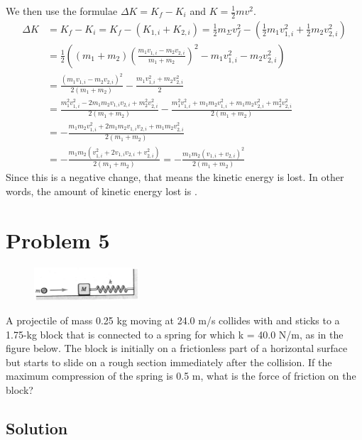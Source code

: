 \documentclass[12pt]{article}
\begin{document}
We then use the formulae \( \Delta K = K_f - K_i \) and \( K = \frac{1}{2}mv^2 \).
\begin{align*}
    \Delta K &= K_f - K_i
        =   K_f - (K_{1,i} + K_{2,i})
        =   \frac{1}{2}m_\Sigma v_f^2 - \left(\frac{1}{2}m_1v_{1,i}^2 + \frac{1}{2}m_2v_{2,i}^2\right)\\
        &=  \frac{1}{2}\left( (m_1 + m_2) \left(\frac{m_1 v_{1,i} - m_2 v_{2,i}}{m_1 + m_2}\right)^2 - m_1v_{1,i}^2 - m_2v_{2,i}^2 \right)\\
        &=  \frac{(m_1 v_{1,i} - m_2 v_{2,i})^2}{2(m_1 + m_2)} - \frac{m_1v_{1,i}^2 + m_2v_{2,i}^2}{2}\\
        &=  \frac{m_1^2 v_{1,i}^2 - 2m_1m_2v_{1,i}v_{2,i} + m_2^2 v_{2,i}^2}{2(m_1 + m_2)} - \frac{m_1^2v_{1,i}^2 + m_1m_2v_{1,i}^2 + m_1m_2v_{2,i}^2 + m_2^2v_{2,i}^2}{2(m_1 + m_2)}\\
        &=  -\frac{m_1m_2v_{1,i}^2 + 2m_1m_2v_{1,i}v_{2,i} + m_1m_2v_{2,i}^2}{2(m_1 + m_2)}\\
        &=  -\frac{m_1m_2(v_{1,i}^2 + 2v_{1,i}v_{2,i} + v_{2,i}^2)}{2(m_1 + m_2)}
        =   -\frac{m_1m_2(v_{1,i} + v_{2,i})^2}{2(m_1 + m_2)}
\end{align*}
Since this is a negative change, that means the kinetic energy is lost. In other words, the amount of kinetic energy lost is .

\pagebreak
\section*{Problem 5}
\begin{figure}
    \vspace{-30pt}
    \includegraphics[width=0.35\textwidth]{graph_5.png} 
\end{figure}
A projectile of mass 0.25 kg moving at 24.0 m/s collides with and sticks to a 1.75-kg block that is connected to a spring for which k = 40.0 N/m, as in the figure below. The block is initially on a frictionless part of a horizontal surface but starts to slide on a rough section immediately after the collision. If the maximum compression of the spring is 0.5 m, what is the force of friction on the block?

\subsection*{Solution}
\end{document}
